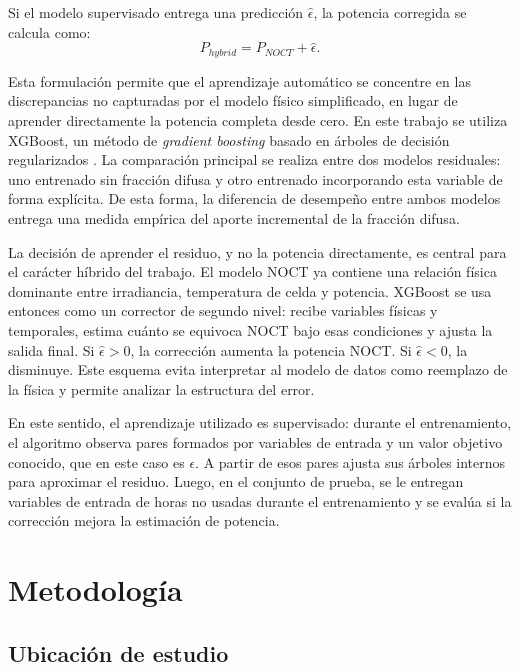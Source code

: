 \documentclass[12pt, letterpaper]{article}
\begin{document}
Si el modelo supervisado entrega una predicci\'on \(\widehat{\epsilon}\), la potencia corregida se calcula como:
\[
    P_{hybrid} = P_{NOCT} + \widehat{\epsilon}.
\]

Esta formulaci\'on permite que el aprendizaje autom\'atico se concentre en las discrepancias no capturadas por el modelo f\'isico simplificado, en lugar de aprender directamente la potencia completa desde cero. En este trabajo se utiliza XGBoost, un m\'etodo de \textit{gradient boosting} basado en \'arboles de decisi\'on regularizados \cite{xgboost2016}. La comparaci\'on principal se realiza entre dos modelos residuales: uno entrenado sin fracci\'on difusa y otro entrenado incorporando esta variable de forma expl\'icita. De esta forma, la diferencia de desempe\~no entre ambos modelos entrega una medida emp\'irica del aporte incremental de la fracci\'on difusa.

La decisión de aprender el residuo, y no la potencia directamente, es central para el carácter híbrido del trabajo. El modelo NOCT ya contiene una relación física dominante entre irradiancia, temperatura de celda y potencia. XGBoost se usa entonces como un corrector de segundo nivel: recibe variables físicas y temporales, estima cuánto se equivoca NOCT bajo esas condiciones y ajusta la salida final. Si \(\widehat{\epsilon}>0\), la corrección aumenta la potencia NOCT. Si \(\widehat{\epsilon}<0\), la disminuye. Este esquema evita interpretar al modelo de datos como reemplazo de la física y permite analizar la estructura del error.

En este sentido, el aprendizaje utilizado es supervisado: durante el entrenamiento, el algoritmo observa pares formados por variables de entrada y un valor objetivo conocido, que en este caso es \(\epsilon\). A partir de esos pares ajusta sus \'arboles internos para aproximar el residuo. Luego, en el conjunto de prueba, se le entregan variables de entrada de horas no usadas durante el entrenamiento y se eval\'ua si la correcci\'on mejora la estimaci\'on de potencia.


\section{Metodolog\'ia}

\subsection{Ubicaci\'on de estudio}
\end{document}
